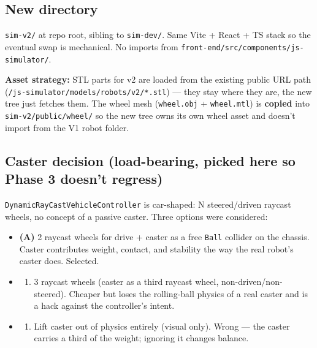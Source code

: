 \documentclass[
]{article}
\providecommand{\tightlist}{%
  \setlength{\itemsep}{0pt}\setlength{\parskip}{0pt}}
\begin{document}
\subsection{New directory}\label{new-directory}

\texttt{sim-v2/} at repo root, sibling to \texttt{sim-dev/}. Same Vite +
React + TS stack so the eventual swap is mechanical. No imports from
\texttt{front-end/src/components/js-simulator/}.

\textbf{Asset strategy:} STL parts for v2 are loaded from the existing
public URL path (\texttt{/js-simulator/models/robots/v2/*.stl}) --- they
stay where they are, the new tree just fetches them. The wheel mesh
(\texttt{wheel.obj} + \texttt{wheel.mtl}) is \textbf{copied} into
\texttt{sim-v2/public/wheel/} so the new tree owns its own wheel asset
and doesn't import from the V1 robot folder.

\subsection{Caster decision (load-bearing, picked here so Phase 3
doesn't
regress)}\label{caster-decision-load-bearing-picked-here-so-phase-3-doesnt-regress}

\texttt{DynamicRayCastVehicleController} is car-shaped: N steered/driven
raycast wheels, no concept of a passive caster. Three options were
considered:

\begin{itemize}
\tightlist
\item
  \textbf{(A)} 2 raycast wheels for drive + caster as a free
  \texttt{Ball} collider on the chassis. Caster contributes weight,
  contact, and stability the way the real robot's caster does. Selected.
\item
  \begin{enumerate}
  \def\labelenumi{(\Alph{enumi})}
  \setcounter{enumi}{1}
  \tightlist
  \item
    3 raycast wheels (caster as a third raycast wheel,
    non-driven/non-steered). Cheaper but loses the rolling-ball physics
    of a real caster and is a hack against the controller's intent.
  \end{enumerate}
\item
  \begin{enumerate}
  \def\labelenumi{(\Alph{enumi})}
  \setcounter{enumi}{2}
  \tightlist
  \item
    Lift caster out of physics entirely (visual only). Wrong --- the
    caster carries a third of the weight; ignoring it changes balance.
  \end{enumerate}
\end{itemize}
\end{document}
